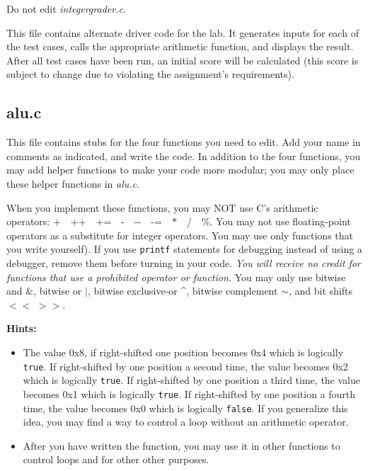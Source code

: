 Do not edit \textit{integergrader.c}.

This file contains alternate driver code for the lab.  It generates inputs for
each of the test cases, calls the appropriate arithmetic function, and displays
the result. After all test cases have been run, an initial score will be
calculated (this score is subject to change due to violating the assignment's
requirements).

\subsection{alu.c}

This file contains stubs for the four functions you need to edit.  Add your
name in comments as indicated, and write the code.  In addition to the four
functions, you may add helper functions to make your code more modular; you may
only place these helper functions in \textit{alu.c}.

When you implement these functions, you may NOT use C's arithmetic operators:
+\ \ ++\ \ +=\ \ -\ \ -{}-\ \ -=\ \ $*$\ \ /\ \ \%. You may not use
floating-point operators as a substitute for integer operators. You may use
only functions that you write yourself). If you use \lstinline{printf}
statements for debugging instead of using a debugger, remove them before
turning in your code. \textit{You will receive no credit for functions that use
a prohibited operator or function.}  You may only use bitwise and $\&$, bitwise
or $|$, bitwise exclusive-or \^{ }, bitwise complement $\sim$, and bit shifts
$<<$ $>>$.

\textbf{Hints:}
\begin{itemize}
\item The value 0x8, if right-shifted one position becomes 0x4 which is
    logically \lstinline{true}. If right-shifted by one position a second time,
    the value becomes 0x2 which is logically \lstinline{true}. If right-shifted
    by one position a third time, the value becomes 0x1 which is logically
    \lstinline{true}. If right-shifted by one position a fourth time, the value
    becomes 0x0 which is logically \lstinline{false}. If you generalize this
    idea, you may find a way to control a loop without an arithmetic operator.
\item After you have written the  function, you may use it in
    other functions to control loops and for other other purposes.
\end{itemize}

